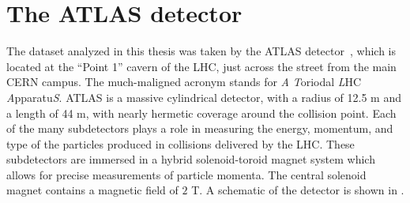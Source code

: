 

\chapter[The ATLAS detector][Top of Page Title]{The ATLAS detector} \label{Chapter-ATLAS}

The dataset analyzed in this thesis was taken by the ATLAS detector~\cite{PERF-2007-01}, which is located at the ``Point 1'' cavern of the LHC, just across the street from the main CERN campus.
The much-maligned acronym stands for \textit{A} \textit{T}oriodal \textit{L}HC \textit{A}pparatu\textit{S}.
ATLAS is a massive cylindrical detector, with a radius of 12.5 m and a length of 44 m, with nearly hermetic coverage around the collision point.
Each of the many subdetectors plays a role in  measuring the energy, momentum, and type of the particles produced in collisions delivered by the LHC.
These subdetectors are immersed in a hybrid solenoid-toroid magnet system which allows for precise measurements of particle momenta.
The central solenoid magnet contains a magnetic field of $2$ T.
A schematic of the detector is shown in .

